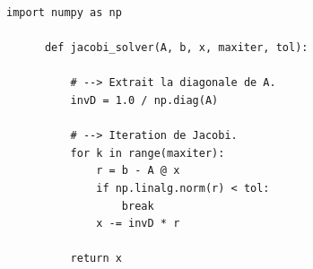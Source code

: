 \documentclass[aspectratio=169]{beamer}
\begin{document}
{
  \begin{frame}[fragile]{}{}
    \vfill
    \begin{lstlisting}[backgroundcolor=\color{white}, basicstyle=\ttfamily\footnotesize\color{black}]
      import numpy as np

      def jacobi_solver(A, b, x, maxiter, tol):

          # --> Extrait la diagonale de A.
          invD = 1.0 / np.diag(A)

          # --> Iteration de Jacobi.
          for k in range(maxiter):
              r = b - A @ x
              if np.linalg.norm(r) < tol:
                  break
              x -= invD * r

          return x
    \end{lstlisting}
    \vfill
  \end{frame}
}
\end{document}
